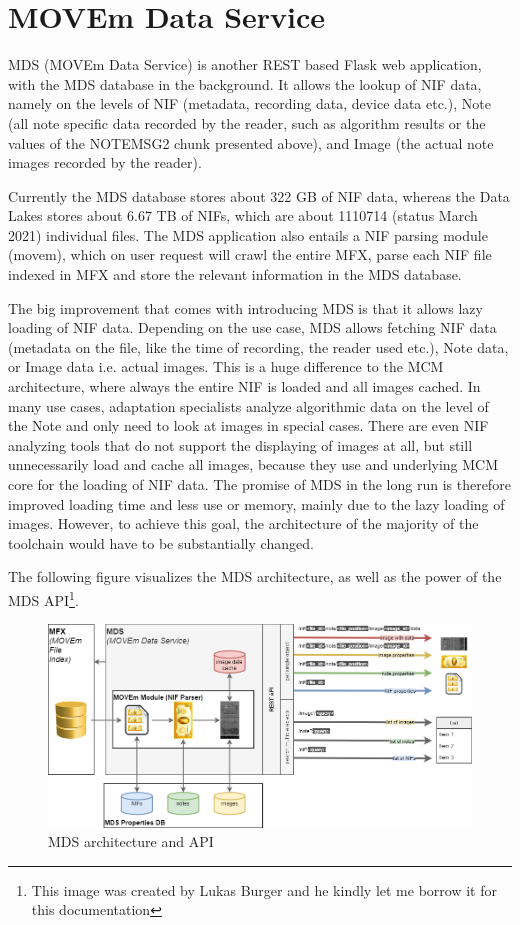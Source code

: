 \section{MOVEm Data Service}
MDS (MOVEm Data Service) is another REST based Flask web application, with the MDS database in the background. It allows the lookup of NIF data, namely on the levels of NIF (metadata, recording data, device data etc.), Note (all note specific data recorded by the reader, such as algorithm results or the values of the NOTEMSG2 chunk presented above), and Image (the actual note images recorded by the reader).\par Currently the MDS database stores about 322 GB of NIF data, whereas the Data Lakes stores about 6.67 TB of NIFs, which are about 1110714 (status March 2021) individual files. The MDS application also entails a NIF parsing module (movem), which on user request will crawl the entire MFX, parse each NIF file indexed in MFX and store the relevant information in the MDS database. \par The big improvement that comes with introducing MDS is that it allows lazy loading of NIF data. Depending on the use case, MDS allows fetching NIF data (metadata on the file, like the time of recording, the reader used etc.), Note data, or Image data i.e. actual images. This is a huge difference to the MCM architecture, where always the entire NIF is loaded and all images cached. In many use cases, adaptation specialists analyze algorithmic data on the level of the Note and only need to look at images in special cases. There are even NIF analyzing tools that do not support the displaying of images at all, but still unnecessarily load and cache all images, because they use and underlying MCM core for the loading of NIF data. The promise of MDS in the long run is therefore improved loading time and less use or memory, mainly due to the lazy loading of images.
 However, to achieve this goal, the architecture of the majority of the toolchain would have to be substantially changed.\par The following figure visualizes the MDS architecture, as well as the power of the MDS API\footnote{This image was created by Lukas Burger and he kindly let me borrow it for this documentation}.
\begin{figure}[ht!]
\includegraphics[width=1.0\textwidth]{images/MDS Overview.png}
  \caption{MDS architecture and API}\label{fig:mds_overview}
\end{figure}

